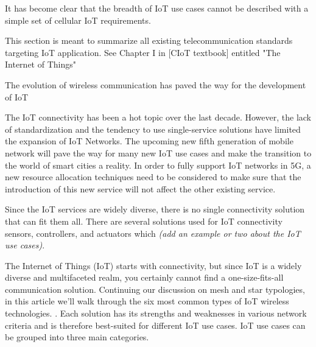 \documentclass[conference]{IEEEtran}
\begin{document}


It has become clear that the breadth of IoT use cases cannot be described with a simple set of cellular IoT requirements.


This section is meant to summarize all existing telecommunication standards targeting IoT application. See Chapter I in [CIoT textbook] \cite{liberg_cellular_2019} entitled "The Internet of Things"

The evolution of wireless communication has paved the way for the development of IoT 

The IoT connectivity has been a hot topic over the last decade. However, the lack of standardization and the tendency to use single-service solutions have limited the expansion of IoT Networks. The upcoming new fifth generation of mobile network will pave the way for many new IoT use cases and make the transition to the world of smart cities a reality. In order to fully support IoT networks in 5G, a new resource allocation techniques need to be considered to make sure that the introduction of this new service will not affect the other existing service.


Since the IoT services are widely diverse, there is no single connectivity solution that can fit them all. There are several solutions used for IoT connectivity sensors, controllers, and actuators which \emph{(add an example or two about the IoT use cases)}.


The Internet of Things (IoT) starts with connectivity, but since IoT is a widely diverse and multifaceted realm, you certainly cannot find a one-size-fits-all communication solution. Continuing our discussion on mesh and star typologies, in this article we’ll walk through the six most common types of IoT wireless technologies.
\cite{herrero_fundamentals_2021}.
Each solution has its strengths and weaknesses in various network criteria and is therefore best-suited for different IoT use cases.
IoT use cases can be grouped into three main categories. 
\end{document}
